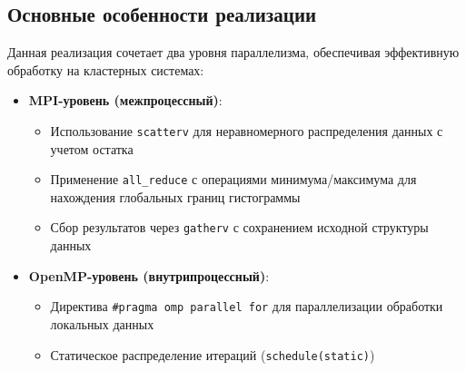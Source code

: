 \documentclass[14pt,a4paper]{extarticle}
\begin{document}
\subsection*{Основные особенности реализации}
Данная реализация сочетает два уровня параллелизма, обеспечивая эффективную обработку на кластерных системах:

\begin{itemize}
\item \textbf{MPI-уровень (межпроцессный)}:
\begin{itemize}
\item Использование \texttt{scatterv} для неравномерного распределения данных с учетом остатка
\item Применение \texttt{all\_reduce} с операциями минимума/максимума для нахождения глобальных границ гистограммы
\item Сбор результатов через \texttt{gatherv} с сохранением исходной структуры данных
\end{itemize}

\item \textbf{OpenMP-уровень (внутрипроцессный)}:
\begin{itemize}
    \item Директива \texttt{\#pragma omp parallel for} для параллелизации обработки локальных данных
    \item Статическое распределение итераций (\texttt{schedule(static)})
\end{itemize}
\end{itemize}
\end{document}
